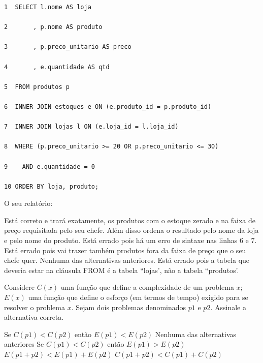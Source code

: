 \documentclass[12pt, addpoints]{exam}
\begin{document}
\begin{questions}
\begin{tcolorbox}

 \begin{verbatim}1  SELECT l.nome AS loja

2       , p.nome AS produto

3       , p.preco_unitario AS preco

4       , e.quantidade AS qtd

5  FROM produtos p

6  INNER JOIN estoques e ON (e.produto_id = p.produto_id)

7  INNER JOIN lojas l ON (e.loja_id = l.loja_id)

8  WHERE (p.preco_unitario >= 20 OR p.preco_unitario <= 30)

9    AND e.quantidade = 0

10 ORDER BY loja, produto;

 \end{verbatim}

\end{tcolorbox}

O seu relatório:
\begin{choices}
\choice Está correto e trará exatamente, os produtos com o estoque zerado e na faixa de preço requisitada pelo seu chefe. Além disso ordena o resultado pelo nome da loja e pelo nome do produto.
\choice Está errado pois há um erro de sintaxe nas linhas 6 e 7.
\choice Está errado pois vai trazer também produtos fora da faixa de preço que o seu chefe quer.
\choice Nenhuma das alternativas anteriores.
\choice Está errado pois a tabela que deveria estar na cláusula FROM é a tabela ``lojas', não a tabela ``produtos'.
\end{choices}

\question

Considere \( C(x) \) uma função que define a complexidade de um problema \( x \); \( E(x) \) uma função que define o esforço (em termos de tempo) exigido para se resolver o problema \( x \). Sejam dois problemas denominados \( p1 \) e \( p2 \). Assinale a alternativa correta.


\begin{choices}
\choice Se \( C(p1) < C(p2) \) então \( E(p1) < E(p2) \)
\choice Nenhuma das alternativas anteriores
\choice Se \( C(p1) < C(p2) \) então \( E(p1) > E(p2) \)
\choice \( E(p1 + p2) < E(p1) + E(p2) \)
\choice \( C(p1 + p2) < C(p1) + C(p2) \)
\end{choices}

\question


\end{questions}
\end{document}
